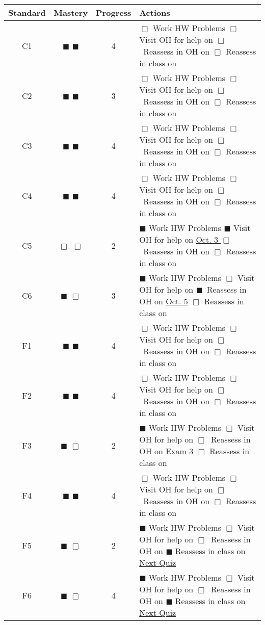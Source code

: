 \documentclass[letterpaper]{article}
\newcommand{\boxes}{\(\Box\) \(\Box\)}
\newcommand{\filledboxes}{\(\blacksquare\) \(\blacksquare\)}
\newcommand{\onefilled}{\(\blacksquare\) \(\Box\)}
\newcommand{\steps}{  \(\Box\) Work HW Problems \hspace{4em} \(\Box\) Visit OH for help on \uline{\hspace{5em}} \newline  \(\Box\)~Reassess in OH on \uline{\hspace{5em}} \(\Box\) Reassess in class on \uline{\hspace{5em}} }
\begin{document}
\begin{tabular}{|c|c|c|p{4.25in}|} \hline
Standard & Mastery & Progress & Actions \\ \hline
C1 & \filledboxes & 4 & \steps \\  \hline
C2 & \filledboxes & 3 & \steps \\  \hline
C3 & \filledboxes & 4 & \steps \\  \hline
C4 & \filledboxes & 4 & \steps \\  \hline
C5 & \boxes & 2 & \(\blacksquare\) Work HW Problems \hspace{4em} \(\blacksquare\) Visit OH for help on \uline{ Oct. 3 } \newline  \(\Box\)~Reassess in OH on \uline{\hspace{5em}} \(\Box\) Reassess in class on \uline{\hspace{5em}} 
 \\  \hline
C6 & \onefilled & 3 & \(\blacksquare\) Work HW Problems \hspace{4em} \(\Box\) Visit OH for help on \uline{\hspace{5em}} \newline  \(\blacksquare\)~Reassess in OH on \uline{Oct. 5} \(\Box\) Reassess in class on \uline{\hspace{5em}} \\  \hline
F1 & \filledboxes & 4 & \steps \\  \hline
F2 & \filledboxes & 4 & \steps \\  \hline
F3 & \onefilled & 2 & \(\blacksquare\) Work HW Problems \hspace{4em} \(\Box\) Visit OH for help on \uline{\hspace{5em}} \newline  \(\Box\)~Reassess in OH on \uline{Exam 3} \(\Box\) Reassess in class on \uline{\hspace{5em}} \\  \hline
F4 & \filledboxes & 4 & \steps \\  \hline
F5 & \onefilled & 2 & \(\blacksquare\) Work HW Problems \hspace{4em} \(\Box\) Visit OH for help on \uline{\hspace{5em}} \newline  \(\Box\)~Reassess in OH on \uline{\hspace{5em}} \(\blacksquare\) Reassess in class on \uline{Next Quiz}  \\  \hline
F6 & \onefilled  & 4 & \(\blacksquare\) Work HW Problems \hspace{4em} \(\Box\) Visit OH for help on \uline{\hspace{5em}} \newline  \(\Box\)~Reassess in OH on \uline{\hspace{5em}} \(\blacksquare\) Reassess in class on \uline{Next Quiz} \\  \hline

\end{tabular}
\end{document}
